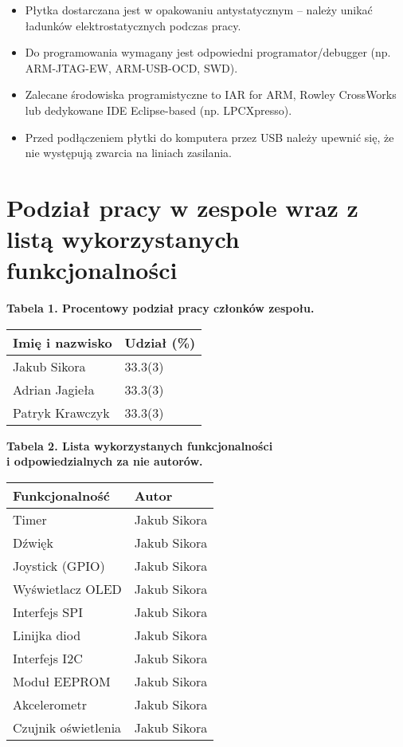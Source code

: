 \documentclass[a4paper,12pt]{report}
\begin{document}
\begin{itemize}
    \item Płytka dostarczana jest w opakowaniu antystatycznym -- należy unikać ładunków elektrostatycznych podczas pracy.
    \item Do programowania wymagany jest odpowiedni programator/debugger (np. ARM-JTAG-EW, ARM-USB-OCD, SWD).
    \item Zalecane środowiska programistyczne to IAR for ARM, Rowley CrossWorks lub dedykowane IDE Eclipse-based (np. LPCXpresso).
    \item Przed podłączeniem płytki do komputera przez USB należy upewnić się, że nie występują zwarcia na liniach zasilania.
\end{itemize}
\clearpage

\chapter{Podział pracy w zespole wraz z listą wykorzystanych funkcjonalności}
\begin{table}[h]
    \centering
    \textbf{Tabela 1. Procentowy podział pracy członków zespołu.\\}
    \vspace{1em}
    \begin{tabular}{|l|l|}
        \hline
        Imię i nazwisko     & Udział (\%) \\
        \hline
        Jakub Sikora        & 33.3(3)      \\
        Adrian Jagieła      & 33.3(3)      \\
        Patryk Krawczyk     & 33.3(3)      \\
        \hline
    \end{tabular}

    \vspace{2em}
    \textbf{Tabela 2. Lista wykorzystanych funkcjonalności \\ i odpowiedzialnych za nie autorów. \\}
    \vspace{1em}
    \begin{tabular}{|l|l|}
        \hline
        Funkcjonalność      & Autor        \\
        \hline
        Timer               & Jakub Sikora \\
        Dźwięk              & Jakub Sikora \\
        Joystick (GPIO)     & Jakub Sikora \\
        Wyświetlacz OLED    & Jakub Sikora \\
        Interfejs SPI       & Jakub Sikora \\
        Linijka diod        & Jakub Sikora \\
        Interfejs I2C       & Jakub Sikora \\
        Moduł EEPROM        & Jakub Sikora \\
        Akcelerometr        & Jakub Sikora \\
        Czujnik oświetlenia & Jakub Sikora \\
        \hline
    \end{tabular}
\end{table}
\end{document}
